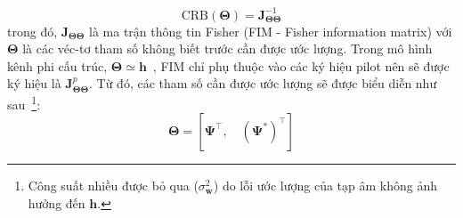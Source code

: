 \begin{equation}
    \text{CRB}(\boldsymbol{\Theta}) = \mathbf{J}_{\boldsymbol{\Theta}\boldsymbol{\Theta}}^{-1}
\end{equation}
trong đó, $\mathbf{J}_{\boldsymbol{\Theta}\boldsymbol{\Theta}}$ là ma trận thông tin Fisher (FIM - Fisher information matrix) với $\boldsymbol{\Theta}$ là các véc-tơ tham số không biết trước cần được ước lượng. Trong mô hình kênh phi cấu trúc, $\boldsymbol{\Theta} \simeq	 \mathbf{h}$~\cite{Ladaycia2017}, FIM chỉ phụ thuộc vào các ký hiệu pilot nên sẽ được ký hiệu là $\mathbf{J}_{\boldsymbol{\Theta}\boldsymbol{\Theta}}^p$. Từ đó, các tham số cần được ước lượng sẽ được biểu diễn như sau~\cite{Menni2012}\footnote{Công suất nhiều được bỏ qua ($\sigma^2_{\mathbf{w}}$) do lỗi ước lượng của tạp âm không ảnh hưởng đến $\mathbf{h}$.}:
\begin{equation}
    \boldsymbol{\Theta}=\left[\boldsymbol{\Psi}^{\top},  \quad  \left(\boldsymbol{\Psi}^{*}\right)^{\top}\right]
\end{equation}

